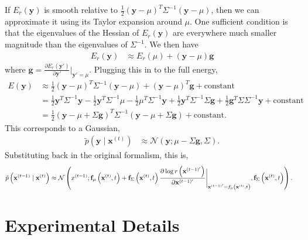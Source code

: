 \documentclass{article}
\newcommand{\pd}[2]{\frac{\partial #1}{\partial #2}}
\newcommand{\mb}{\mathbf}
\newcommand{\mc}{\mathcal}
\begin{document}
If $E_r\left( \mb y \right)$ is smooth relative to $\frac{1}{2} \left( \mb y - \mu \right)^T \Sigma^{-1} \left( \mb y - \mu \right)$, then we can approximate it using its Taylor expansion around $\mu$. One sufficient condition is that the eigenvalues of the Hessian of $E_r\left( \mb y \right)$ are everywhere much smaller magnitude than the eigenvalues of $\Sigma^{-1}$. We then have
\begin{align}
E_r\left( \mb y \right) & \approx E_r\left( \mu \right) + \left( \mb y - \mu \right) \mb g
\end{align}
where $\mb g = \pd{E_r\left( \mb y' \right)}{\mb y'} \bigg|_{\mb y'=\mu}$. Plugging this in to the full energy,
\begin{align}
E\left( \mb y \right) &\approx \frac{1}{2} \left( \mb y - \mu \right)^T \Sigma^{-1} \left( \mb y - \mu \right) + \left( \mb y - \mu \right)^T \mb g + \text{constant} \\
&= \frac{1}{2} \mb y^T \Sigma^{-1} \mb y 
	- \frac{1}{2} \mb y^T \Sigma^{-1} \mu
	- \frac{1}{2} \mu^T \Sigma^{-1} \mb y
	+ \frac{1}{2} \mb y^T \Sigma^{-1} \Sigma \mb g
	+ \frac{1}{2} \mb g^T \Sigma  \Sigma^{-1} \mb y
	+ \text{constant}
	\\
&=	\frac{1}{2}
	\left( \mb y - \mu + \Sigma \mb g\right)^T 
	\Sigma^{-1} 
	\left( \mb y - \mu + \Sigma \mb g \right)
	+ \text{constant}
.
\end{align}
This corresponds to a Gaussian,
\begin{align}
\tilde{p}\left( \mb y \mid \mb x^{(t)} \right)
&\approx 
	\mc N \left( \mb y ;
		\mu - \Sigma \mb g,
		\Sigma 
		\right)
.
\end{align}
Substituting back in the original formalism, this is,
\begin{align}
\tilde{p}\left( \mb x^{(t-1)} \mid \mb x^{(t)} \right)
&\approx 
	\mc N \left( \mb \mb x^{(t-1)} ;
		\mb f_\mu\left( \mb x^{(t)}, t \right) + \mb f_\Sigma\left( \mb x^{(t)}, t \right)
		\pd{
			\log r\left( \mb x^{(t-1)'} \right)
			}{
			\mb x^{(t-1)'}
			}\Bigg|_{\mb x^{(t-1)'}=f_\mu\left( \mb x^{(t)}, t \right)}
			,
		\mb f_\Sigma\left( \mb x^{(t)}, t \right) 
		\right)
.
\end{align}

\twocolumn

\setcounter{figure}{0} \renewcommand{\thefigure}{D.\arabic{figure}}
\setcounter{table}{0} \renewcommand{\thetable}{D.\arabic{table}}

\section{Experimental Details}\label{app experiments}
\end{document}
